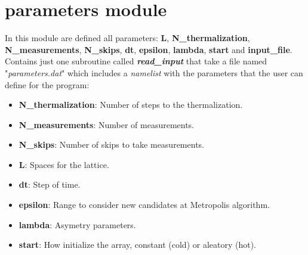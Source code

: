 \section{parameters module}

In this module are defined all parameters: \textbf{L}, \textbf{N\_thermalization}, \textbf{N\_measurements}, \textbf{N\_skips}, \textbf{dt}, \textbf{epsilon}, \textbf{lambda}, \textbf{start} and \textbf{input\_file}. Contains just one subroutine called \textbf{\textit{read\_input}} that take a file named "\textit{parameters.dat}" which includes a \textit{namelist} with the parameters that the user can define for the program:

\begin{itemize}
\item \textbf{N\_thermalization}: Number of steps to the thermalization.
\item \textbf{N\_measurements}: Number of measurements.
\item \textbf{N\_skips}: Number of skips to take measurements.
\item \textbf{L}: Spaces for the lattice.
\item \textbf{dt}: Step of time.
\item \textbf{epsilon}: Range to consider new candidates at Metropolis algorithm.
\item \textbf{lambda}: Asymetry parameters.
\item \textbf{start}: How initialize the array, constant (cold) or aleatory (hot).
\end{itemize}